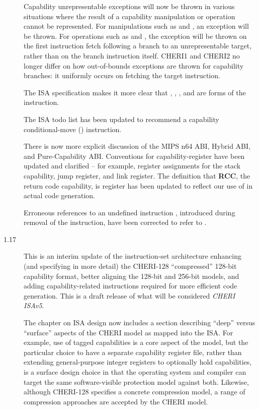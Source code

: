 \begin{description}
  Capability unrepresentable exceptions will now be thrown in various
  situations where the result of a capability manipulation or operation cannot
  be represented.
  For manipulations such as  and ,
  an exception will be thrown.
  For operations such as  and , the
  exception will be thrown on the first instruction fetch following a branch
  to an unrepresentable target, rather than on the branch instruction itself.
  CHERI1 and CHERI2 no longer differ on how out-of-bounds exceptions are
  thrown for capability branches: it uniformly occurs on fetching the target
  instruction.

  The ISA specification makes it more clear that ,
  , , and  are
  forms of the  instruction.

  The ISA todo list has been updated to recommend a capability
  conditional-move () instruction.

  There is now more explicit discussion of the MIPS n64 ABI, Hybrid ABI,
  and Pure-Capability ABI.
  Conventions for capability-register have been updated and clarified --
  for example, register assignments for the stack capability, jump register,
  and link register.
  The definition that {\bf RCC}, the return code capability, is register
   has been updated to reflect our use of  in actual code
  generation.

  Erroneous references to an undefined instruction ,
  introduced during removal of the  instruction, have
  been corrected to refer to .

\item[1.17] This is an interim update of the instruction-set architecture
  enhancing (and specifying in more detail) the CHERI-128 ``compressed''
  128-bit capability format, better aligning the 128-bit and 256-bit models,
  and adding capability-related instructions required for more efficient code
  generation.
  This is a draft release of what will be considered \textit{CHERI ISAv5}.

  The chapter on ISA design now includes a section describing ``deep'' versus
  ``surface'' aspects of the CHERI model as mapped into the ISA.
  For example, use of tagged capabilities is a core aspect of the model, but
  the particular choice to have a separate capability register file, rather
  than extending general-purpose integer registers to optionally hold capabilities, is
  a surface design choice in that the operating system and compiler can target
  the same software-visible protection model against both.
  Likewise, although CHERI-128 specifies a concrete compression model, a range
  of compression approaches are accepted by the CHERI model.


\end{description}
